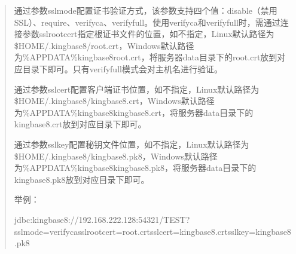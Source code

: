 \documentclass[a4,10pt,oneside,english]{sphinxmanual}
\begin{document}
\begin{quote}

通过参数sslmode配置证书验证方式，该参数支持四个值：disable（禁用SSL）、require、verify\sphinxhyphen{}ca、verify\sphinxhyphen{}full。使用verify\sphinxhyphen{}ca和verify\sphinxhyphen{}full时，需通过连接参数sslrootcert指定根证书文件的位置，如不指定，Linux默认路径为\$HOME/.kingbase8/root.crt，Windows默认路径为\%APPDATA\%kingbase8root.crt，将服务器data目录下的root.crt放到对应目录下即可。只有verify\sphinxhyphen{}full模式会对主机名进行验证。

通过参数sslcert配置客户端证书位置，如不指定，Linux默认路径为\$HOME/.kingbase8/kingbase8.crt，Windows默认路径为\%APPDATA\%kingbase8kingbase8.crt，将服务器data目录下的kingbase8.crt放到对应目录下即可。

通过参数sslkey配置秘钥文件位置，如不指定，Linux默认路径为\$HOME/.kingbase8/kingbase8.pk8，Windows默认路径为\%APPDATA\%kingbase8kingbase8.pk8，将服务器data目录下的kingbase8.pk8放到对应目录下即可。

举例：

\begin{sphinxVerbatim}[commandchars=\\\{\}]
jdbc:kingbase8://192.168.222.128:54321/TEST?sslmode=verify\PYGZhy{}ca\PYGZam{}sslrootcert=root.crt\PYGZam{}sslcert=kingbase8.crt\PYGZam{}sslkey=kingbase8.pk8
\end{sphinxVerbatim}
\end{quote}

\end{document}
